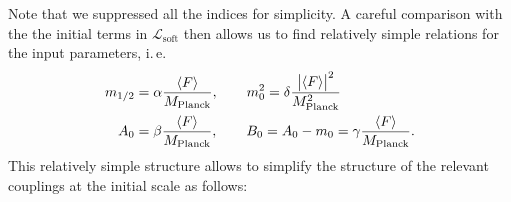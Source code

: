 Note that we suppressed all the indices for simplicity. A careful comparison with the the initial terms in $\mathcal{L}_{\mathrm{soft}}$ then allows us to find relatively simple relations for the input parameters, i.\,e.
\begin{equation}
	\begin{aligned}
		m_{1/2} &= \alpha\frac{\langle F\rangle}{M_{\mathrm{Planck}}}, \qquad m_{0}^2 = \delta\frac{\abs{\langle F\rangle}^2}{M_{\mathrm{Planck}}^2}\\
		A_0 &= \beta\frac{\langle F\rangle}{M_{\mathrm{Planck}}}, \qquad B_{0} = A_0 - m_0 = \gamma\frac{\langle F\rangle}{M_{\mathrm{Planck}}}.
	\end{aligned}
\end{equation}
This relatively simple structure allows to simplify the structure of the relevant couplings at the initial scale as follows:


